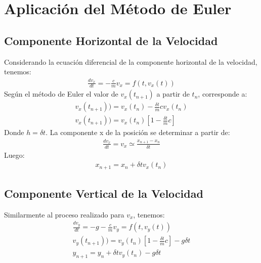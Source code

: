 \documentclass[12pt,a4paper,twoside]{article}
\begin{document}
\section{Aplicación del Método de Euler}
\subsection{Componente Horizontal de la Velocidad}
Considerando la ecuación diferencial de la componente horizontal de la velocidad, tenemos:
\begin{eqnarray}
\frac{dv_{x}}{dt}=-\frac{c}{m}v_{x}=f(t,v_{x}(t))
\end{eqnarray}
Según el método de Euler el valor de $v_{x}(t_{n+1})$ a partir de $t_{n}$, corresponde a:
\begin{eqnarray}
v_{x}(t_{n+1}))=v_{x}(t_{n})-\frac{\delta t}{m}cv_{x}(t_{n})\nonumber\\
v_{x}(t_{n+1}))=v_{x}(t_{n})[1-\frac{\delta t}{m}c]
\end{eqnarray}
Donde $h=\delta t$. La componente x de la posición se determinar a partir de:
\begin{eqnarray}
\frac{dv_{x}}{dt}=v_{x}\simeq \frac{x_{n+1}-x_{n}}{\delta t}
\end{eqnarray}
Luego:
\begin{eqnarray}
x_{n+1}=x_{n}+{\delta t}v_{x}(t_{n})
\end{eqnarray}
\subsection{Componente Vertical de la Velocidad}
Similarmente al proceso realizado para $v_{x}$, tenemos:
\begin{eqnarray}
\frac{dv_{y}}{dt}=-g-\frac{c}{m}v_{y}=f(t,v_{y}(t))\\
v_{y}(t_{n+1}))=v_{y}(t_{n})[1-\frac{\delta t}{m}c]-g\delta t\\
y_{n+1}=y_{n}+{\delta t}v_{y}(t_{n})-g\delta t
\end{eqnarray}
\end{document}

